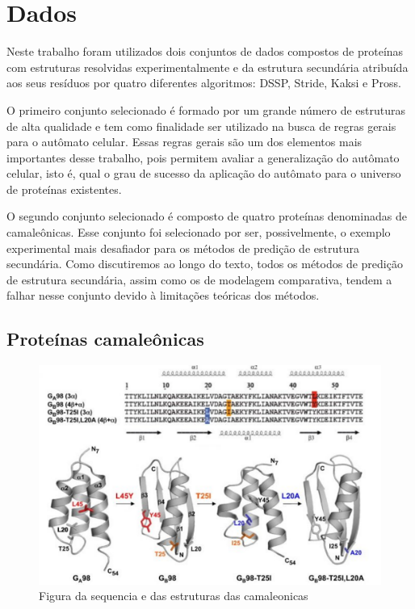 \chapter{Dados}

Neste trabalho foram utilizados dois conjuntos de dados compostos de proteínas com estruturas resolvidas experimentalmente e da estrutura secundária atribuída aos seus resíduos por quatro diferentes algoritmos: DSSP, Stride, Kaksi e Pross.

O primeiro conjunto selecionado é formado por um grande número de estruturas de alta qualidade e tem como finalidade ser utilizado na busca de regras gerais para o autômato celular. Essas regras gerais são um dos elementos mais importantes desse trabalho, pois permitem avaliar a generalização do autômato celular, isto é, qual o grau de sucesso da aplicação do autômato para o universo de proteínas existentes.

O segundo conjunto selecionado é composto de quatro proteínas denominadas de camaleônicas. Esse conjunto foi selecionado por ser, possivelmente, o exemplo experimental mais desafiador para os métodos de predição de estrutura secundária. Como discutiremos ao longo do texto, todos os métodos de predição de estrutura secundária, assim como os de modelagem comparativa, tendem a falhar nesse conjunto devido à limitações teóricas dos métodos.

\section{Proteínas camaleônicas}

\begin{figure}
	\centering
	\includegraphics[width=1.0\textwidth]{figures/chameleonic_resume.pdf}
	\caption{Figura da sequencia e das estruturas das camaleonicas}
\end{figure}

